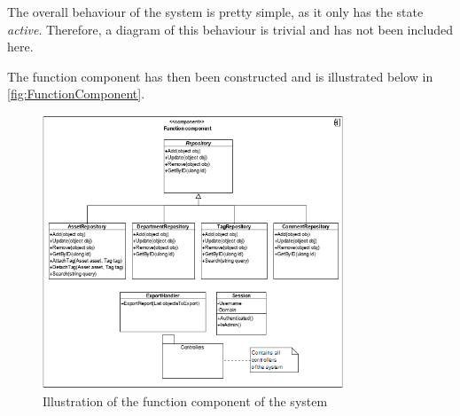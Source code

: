 \par
The overall behaviour of the system is pretty simple, as it only has the state \textit{active}. Therefore, a diagram of this behaviour is trivial and has not been included here.
\par
The function component has then been constructed and is illustrated below in \autoref{fig:FunctionComponent}.
\begin{figure}[H]
    \centering
    \includegraphics[width=0.8\textwidth]{figures/FunctionComponent/FunctionComponent.png}
    \caption{Illustration of the function component of the system}
    \label{fig:FunctionComponent}
\end{figure}